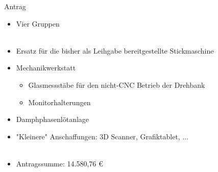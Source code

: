 \documentclass[t]{beamer}
\begin{document}
\begin{frame}{Antrag}
	\begin{itemize}
		\item Vier Gruppen\\~
		\item Ersatz für die bisher als Leihgabe bereitgestellte Stickmaschine
		\item Mechanikwerkstatt 
			\begin{itemize}
				\item Glasmessstäbe für den nicht-CNC Betrieb der Drehbank
				\item Monitorhalterungen 
			\end{itemize}
		\item Damphphasenlötanlage
		\item "Kleinere" Anschaffungen: 3D Scanner, Grafiktablet, ...\\~
		\item Antragssumme: 14.580,76 €
	\end{itemize}
\end{frame}
\end{document}
